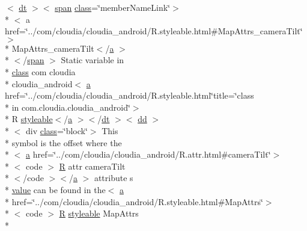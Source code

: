 \begin{DoxyCompactItemize}
$<$ \hyperlink{stylesheet_8css_a107565fb4039d33b041380d6e0ea1d80}{dt} $>$$<$ \hyperlink{stylesheet_8css_a8343996ebcf16220b04e54659aac31cc}{span} \hyperlink{_tools_8html_acf06f836132665ba8114f5a414c2403f}{class}=\char`\"{}member\-Name\-Link\char`\"{}$>$\\*
$<$ a href=\char`\"{}../com/cloudia/cloudia\-\_\-android/R.\-styleable.\-html\#Map\-Attrs\-\_\-camera\-Tilt\char`\"{}$>$\\*
 Map\-Attrs\-\_\-camera\-Tilt$<$/\hyperlink{style_8css_a5e8981582017bb8b84c21f148345d1f7}{a} $>$\\*
$<$/\hyperlink{stylesheet_8css_a8343996ebcf16220b04e54659aac31cc}{span} $>$ Static variable in \\*
\hyperlink{_tools_8html_acf06f836132665ba8114f5a414c2403f}{class} com cloudia \\*
cloudia\-\_\-android$<$ \hyperlink{style_8css_a5e8981582017bb8b84c21f148345d1f7}{a} href=\char`\"{}../com/cloudia/cloudia\-\_\-android/R.\-styleable.\-html\char`\"{}title=\char`\"{}class \\*
in com.\-cloudia.\-cloudia\-\_\-android\char`\"{}$>$\\*
 R \hyperlink{index-17_8html_ae6c9bf1e41380184b4b665ca9ab6ba0a}{styleable}$<$/\hyperlink{style_8css_a5e8981582017bb8b84c21f148345d1f7}{a} $>$$<$/\hyperlink{stylesheet_8css_a107565fb4039d33b041380d6e0ea1d80}{dt} $>$$<$ \hyperlink{stylesheet_8css_a47f4718a86835a7771ec592ece845221}{dd} $>$\\*
$<$ div \hyperlink{_tools_8html_acf06f836132665ba8114f5a414c2403f}{class}=\char`\"{}block\char`\"{}$>$ This \\*
symbol is the offset where the\\*
$<$ \hyperlink{style_8css_a5e8981582017bb8b84c21f148345d1f7}{a} href=\char`\"{}../com/cloudia/cloudia\-\_\-android/R.\-attr.\-html\#camera\-Tilt\char`\"{}$>$\\*
$<$ code $>$ \hyperlink{index-16_8html_a31e8fe59be5c20ce90a0090e28a0c1fe}{R} attr camera\-Tilt\\*
$<$/code $>$$<$/\hyperlink{style_8css_a5e8981582017bb8b84c21f148345d1f7}{a} $>$ attribute s \\*
\hyperlink{_my_s_q_l_connector_8measure_8html_afcc7a4b78ecd8fa7e713f8cfa0f51017}{value} can be found in the$<$ \hyperlink{style_8css_a5e8981582017bb8b84c21f148345d1f7}{a} \\*
href=\char`\"{}../com/cloudia/cloudia\-\_\-android/R.\-styleable.\-html\#Map\-Attrs\char`\"{}$>$\\*
$<$ code $>$ \hyperlink{index-16_8html_a31e8fe59be5c20ce90a0090e28a0c1fe}{R} \hyperlink{index-17_8html_ae6c9bf1e41380184b4b665ca9ab6ba0a}{styleable} Map\-Attrs\\*

\end{DoxyCompactItemize}
